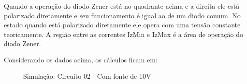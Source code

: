 Quando a operação do diodo Zener está no quadrante acima e a direita ele está polarizado diretamente e seu funcionamento é igual ao de um diodo comum. No estado quando está polarizado diretamente ele opera com uma tensão constante teoricamente. A região entre as correntes IzMin e IzMax é a área de operação do diodo Zener.

\begin{Resolucao}[H]
    \label{res:circuito03}
\end{Resolucao}

Considerando os dados acima, os cálculos ficam em:

\begin{Resolucao}[H]
    \label{res:circuito03}
\end{Resolucao}

\begin{figure}[H]
    \centering
    \caption{Simulação: Circuito 02 - Com fonte de 10V}
    \vspace{-0.3cm}
    \label{fig:SimulacaoCircuito03}
\end{figure}

